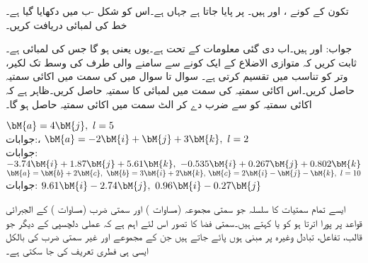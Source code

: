 تکون کے کونے ،  اور  ہیں۔ پر  پایا جاتا ہے جہاں
  ہے۔اس کو شکل -ب میں دکھایا گیا ہے۔خط  کی لمبائی دریافت کریں۔

جواب: اور  ہیں۔اب دی گئی معلومات کے تحت  ہے۔یوں  یعنی  ہو گا جس کی لمبائی  ہے۔
ثابت کریں کہ متوازی الاضلاع کے ایک کونے سے سامنے والی طرف کی وسط تک لکیر، وتر کو  تناسب میں تقسیم کرتی ہے۔
سوال  تا سوال  میں  کی سمت میں اکائی سمتیہ حاصل کریں۔اس اکائی سمتیہ کی سمت میں  لمبائی کا سمتیہ حاصل کریں۔ظاہر ہے کہ اکائی سمتیہ کو  سے ضرب دے کر الٹ سمت میں اکائی سمتیہ حاصل ہو گا۔ 

\quad  
$\bM{a}=4\bM{j},\,\,  l=5$\\
جوابات:، 
\quad  
$\bM{a}=-2\bM{i}+\bM{j}+3\bM{k},\,\, l=2$\\
جوابات:
$-3.74\bM{i}+1.87\bM{j}+5.61\bM{k},\,\,-0.535\bM{i}+0.267\bM{j}+0.802\bM{k}$
\quad  
$\bM{a}=\bM{b}+2\bM{c},\,\,\bM{b}=3\bM{i}+2\bM{k},\, \bM{c}=2\bM{i}-\bM{j}-\bM{k},\,\,  l=10$\\
جوابات:
$9.61\bM{i}-2.74\bM{j},\,\,0.96\bM{i}-0.27\bM{j}$

ایسے تمام سمتیات کا سلسلہ  جو سمتی مجموعہ (مساوات ) اور سمتی ضرب (مساوات ) کے الجبرائی قواعد پر پورا اترتا ہو کو  یا   کہتے ہیں۔سمتی فضا کا تصور اس لئے اہم ہے کہ عملی دلچسپی کے دیگر   جو قالب، تفاعل، تبادل وغیرہ پر مبنی ہوں پائے جاتے ہیں جن کے مجموعے اور غیر سمتی ضرب کی بالکل ایسی ہی فطری  تعریف کی جا سکتی ہے۔      

